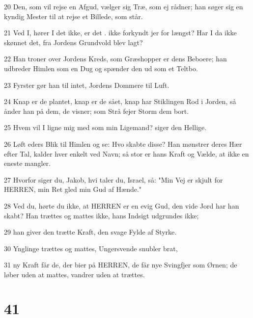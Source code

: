 \par 20 Den, som vil rejse en Afgud, vælger sig Træ, som ej rådner; han søger sig en kyndig Mester til at rejse et Billede, som står.
\par 21 Ved I, hører I det ikke, er det . ikke forkyndt jer for længst? Har I da ikke skønnet det, fra Jordens Grundvold blev lagt?
\par 22 Han troner over Jordens Kreds, som Græshopper er dens Beboere; han udbreder Himlen som en Dug og spænder den ud som et Teltbo.
\par 23 Fyrster gør han til intet, Jordens Dommere til Luft.
\par 24 Knap er de plantet, knap er de sået, knap har Stiklingen Rod i Jorden, så ånder han på dem, de visner; som Strå fejer Storm dem bort.
\par 25 Hvem vil I ligne mig med som min Ligemand? siger den Hellige.
\par 26 Løft eders Blik til Himlen og se: Hvo skabte disse? Han mønstrer deres Hær efter Tal, kalder hver enkelt ved Navn; så stor er hans Kraft og Vælde, at ikke en eneste mangler.
\par 27 Hvorfor siger du, Jakob, hvi taler du, Israel, så: "Min Vej er skjult for HERREN, min Ret gled min Gud af Hænde."
\par 28 Ved du, hørte du ikke, at HERREN er en evig Gud, den vide Jord har han skabt? Han trættes og mattes ikke, hans Indsigt udgrundes ikke;
\par 29 han giver den trætte Kraft, den svage Fylde af Styrke.
\par 30 Ynglinge trættes og mattes, Ungersvende snubler brat,
\par 31 ny Kraft får de, der bier på HERREN, de får nye Svingfjer som Ørnen; de løber uden at mattes, vandrer uden at trættes.

\chapter{41}

